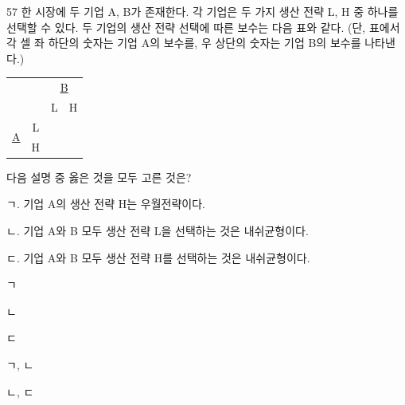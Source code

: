\begin{question}{57}
한 시장에 두 기업 A, B가 존재한다. 각 기업은 두 가지 생산 전략 L, H 중 하나를 선택할 수 있다. 두 기업의 생산 전략 선택에 따른 보수는 다음 표와 같다. (단, 표에서 각 셀 좌 하단의 숫자는 기업 A의 보수를, 우 상단의 숫자는 기업 B의 보수를 나타낸다.)
\begin{center}
\renewcommand{\arraystretch}{1.2}
\begin{tabular}{cc|c|c|}
\multicolumn{2}{c}{} & \multicolumn{2}{c}{\uline{B}} \\
\multicolumn{2}{c}{} & \multicolumn{1}{c}{L} & \multicolumn{1}{c}{H} \\ \cline{3-4}
\multirow{2}{*}{\uline{A}} & L & \parbox[c]{1.4cm}{{\par}\vspace{4pt}{\raggedright 1\par}} & \parbox[c]{1.4cm}{{\par}\vspace{4pt}{\raggedright 0\par}} \\ 
 & H & \parbox[c]{1.4cm}{{\par}\vspace{4pt}{\raggedright 0\par}} & \parbox[c]{1.4cm}{{\par}\vspace{4pt}{\raggedright 0\par}} \\ 
\end{tabular}
\end{center}
다음 설명 중 옳은 것을 모두 고른 것은?
\begin{framedtext}
ㄱ. 기업 A의 생산 전략 H는 우월전략이다. \par
ㄴ. 기업 A와 B 모두 생산 전략 L을 선택하는 것은 내쉬균형이다. \par
ㄷ. 기업 A와 B 모두 생산 전략 H를 선택하는 것은 내쉬균형이다.
\end{framedtext}
\begin{choices}
  \item ㄱ
  \item ㄴ
  \item ㄷ
  \item ㄱ, ㄴ
  \item ㄴ, ㄷ
\end{choices}
\end{question}
